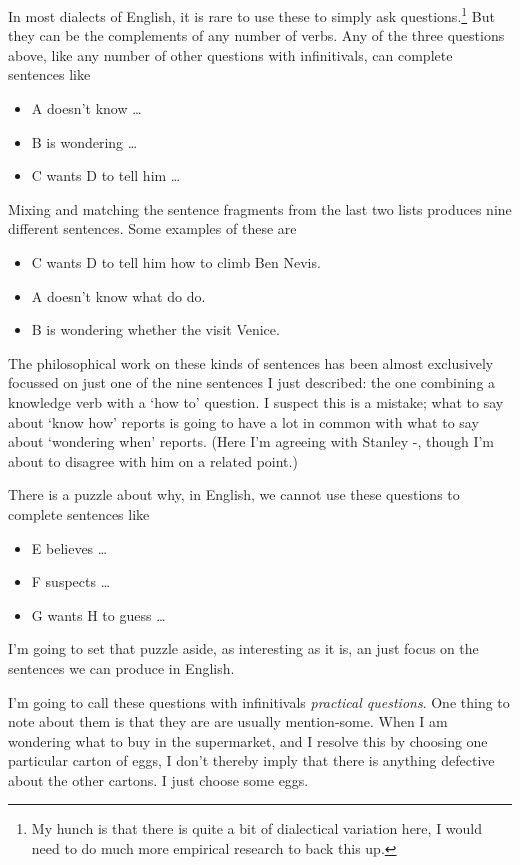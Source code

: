 \documentclass[
  11pt,
]{book}
\providecommand{\tightlist}{%
  \setlength{\itemsep}{0pt}\setlength{\parskip}{0pt}}
\begin{document}
In most dialects of English, it is rare to use these to simply ask questions.\footnote{My hunch is that there is quite a bit of dialectical variation here, I would need to do much more empirical research to back this up.} But they can be the complements of any number of verbs. Any of the three questions above, like any number of other questions with infinitivals, can complete sentences like

\begin{itemize}
\tightlist
\item
  A doesn't know \ldots{}
\item
  B is wondering \ldots{}
\item
  C wants D to tell him \ldots{}
\end{itemize}

Mixing and matching the sentence fragments from the last two lists produces nine different sentences. Some examples of these are

\begin{itemize}
\tightlist
\item
  C wants D to tell him how to climb Ben Nevis.
\item
  A doesn't know what do do.
\item
  B is wondering whether the visit Venice.
\end{itemize}

The philosophical work on these kinds of sentences has been almost exclusively focussed on just one of the nine sentences I just described: the one combining a knowledge verb with a `how to' question. I suspect this is a mistake; what to say about `know how' reports is going to have a lot in common with what to say about `wondering when' reports. (Here I'm agreeing with Stanley -\citet{Stanley2011}, though I'm about to disagree with him on a related point.)

There is a puzzle about why, in English, we cannot use these questions to complete sentences like

\begin{itemize}
\tightlist
\item
  E believes \ldots{}
\item
  F suspects \ldots{}
\item
  G wants H to guess \ldots{}
\end{itemize}

I'm going to set that puzzle aside, as interesting as it is, an just focus on the sentences we can produce in English.

I'm going to call these questions with infinitivals \emph{practical questions}. One thing to note about them is that they are are usually mention-some. When I am wondering what to buy in the supermarket, and I resolve this by choosing one particular carton of eggs, I don't thereby imply that there is anything defective about the other cartons. I just choose some eggs.
\end{document}
